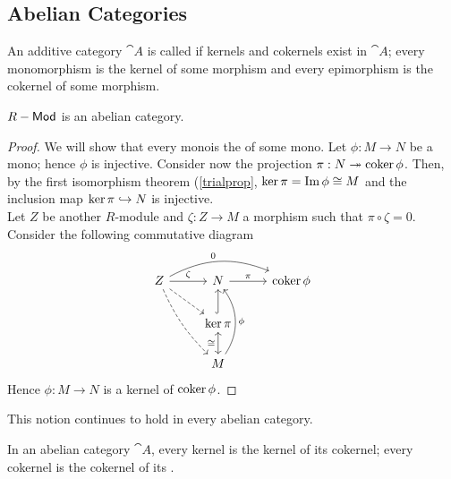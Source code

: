 \documentclass[11pt,twoside]{memoir}
\begin{document}
\subsection{Abelian Categories}
\begin{defn}
	An additive category $\cat{A}$ is called  if kernels and cokernels exist in $\cat{A}$; every monomorphism is the kernel of some morphism and every epimorphism is the cokernel of some morphism.
\end{defn}
\begin{prop}
	$R-\mathsf{Mod}$ is an abelian category.
\end{prop} 
\begin{proof}
	We will show that every mono\morph is the \tker of some mono\morph. Let $\phi:M\to N$ be a mono\morph; hence $\phi$ is injective. Consider now the projection $\pi: N \twoheadrightarrow \operatorname{coker}\phi$. Then, by the first isomorphism theorem (\cref{trialprop}, $\ker \pi = \operatorname{Im} \phi \cong M$ and the inclusion map $\ker \pi \hookrightarrow N$ is injective.\\
	Let $Z$ be another $R$-module and $\zeta:Z\to M$ a morphism such that $\pi \circ \zeta = 0$. Consider the following commutative diagram
	\[
	\begin{tikzcd}
	Z\ar{r}{\zeta}\ar[dashed]{dr}\ar[dashed, bend left = -10]{ddr} \ar[bend left=25]{rr}{0} & N \ar{r}{\pi}& \coker \phi \\
	& \ker \pi \ar[hookrightarrow]{u}& \\
	& M \ar[leftrightarrow]{u}{\cong} \ar[bend left= -35,swap]{uu}{\phi}&
	\end{tikzcd}
	\]
	Hence $\phi:M\to N$ is a kernel of $\operatorname{coker} \phi$.
\end{proof}
This notion continues to hold in every abelian category.
\begin{prop}
	In an abelian category $\cat{A}$, every kernel is the kernel of its cokernel; every cokernel is the cokernel of its \tker.
\end{prop}
\end{document}
